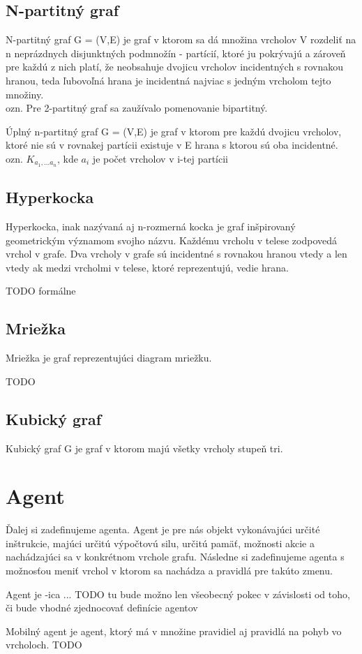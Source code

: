 \subsection{N-partitný graf}
\begin{defin}
N-partitný graf G = (V,E) je graf v ktorom sa dá množina vrcholov V rozdeliť na n neprázdnych disjunktných podmnožín - partícií, ktoré ju pokrývajú a zároveň pre každú z nich platí, že neobsahuje dvojicu vrcholov incidentných s rovnakou hranou, teda ľubovoľná hrana je incidentná najviac s jedným vrcholom tejto množiny.\\
ozn. Pre 2-partitný graf sa zaužívalo pomenovanie bipartitný.
\end{defin}

\begin{defin}
Úplný n-partitný graf G = (V,E) je graf v ktorom pre každú dvojicu vrcholov, ktoré nie sú v rovnakej partícii existuje v E hrana s ktorou sú oba incidentné.\\
ozn. $K_{a_1,...a_n}$, kde $a_i$ je počet vrcholov v i-tej partícii
\end{defin}

\subsection{Hyperkocka}
Hyperkocka, inak nazývaná aj n-rozmerná kocka je graf inšpirovaný geometrickým významom svojho názvu. Každému vrcholu v telese zodpovedá vrchol v grafe. Dva vrcholy v grafe sú incidentné s rovnakou hranou vtedy a len vtedy ak medzi vrcholmi v telese, ktoré reprezentujú, vedie hrana.
\begin{defin}
TODO formálne
\end{defin}
\subsection{Mriežka}
Mriežka je graf reprezentujúci diagram mriežku.
\begin{defin}
TODO
\end{defin}
\subsection{Kubický graf}
\begin{defin}
Kubický graf G je graf v ktorom majú všetky vrcholy stupeň tri.
\end{defin}
\section{Agent}
Ďalej si zadefinujeme agenta. Agent je pre nás objekt vykonávajúci určité inštrukcie, majúci určitú výpočtovú silu, určitú pamäť, možnosti akcie a nachádzajúci sa v konkrétnom vrchole grafu. Následne si zadefinujeme agenta s možnosťou meniť vrchol v ktorom sa nachádza a pravidlá pre takúto zmenu.\\
\begin{defin}
Agent je -ica ... TODO tu bude možno len všeobecný pokec v závislosti od toho, či bude vhodné zjednocovať definície agentov
\end{defin}

\begin{defin}
Mobilný agent je agent, ktorý má v množine pravidiel aj pravidlá na pohyb vo vrcholoch.
TODO
\end{defin}

